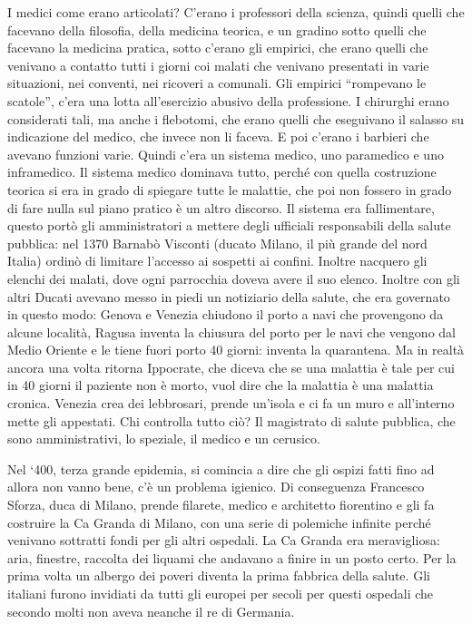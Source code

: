 \documentclass[]{article}
\begin{document}
I medici come erano articolati? C'erano i professori della scienza,
quindi quelli che facevano della filosofia, della medicina teorica, e un
gradino sotto quelli che facevano la medicina pratica, sotto c'erano gli
empirici, che erano quelli che venivano a contatto tutti i giorni coi
malati che venivano presentati in varie situazioni, nei conventi, nei
ricoveri a comunali. Gli empirici ``rompevano le scatole'', c'era una
lotta all'esercizio abusivo della professione. I chirurghi erano
considerati tali, ma anche i flebotomi, che erano quelli che eseguivano
il salasso su indicazione del medico, che invece non li faceva. E poi
c'erano i barbieri che avevano funzioni varie. Quindi c'era un sistema
medico, uno paramedico e uno inframedico. Il sistema medico dominava
tutto, perché con quella costruzione teorica si era in grado di spiegare
tutte le malattie, che poi non fossero in grado di fare nulla sul piano
pratico è un altro discorso. Il sistema era fallimentare, questo portò
gli amministratori a mettere degli ufficiali responsabili della salute
pubblica: nel 1370 Barnabò Visconti (ducato Milano, il più grande del
nord Italia) ordinò di limitare l'accesso ai sospetti ai confini.
Inoltre nacquero gli elenchi dei malati, dove ogni parrocchia doveva
avere il suo elenco. Inoltre con gli altri Ducati avevano messo in piedi
un notiziario della salute, che era governato in questo modo: Genova e
Venezia chiudono il porto a navi che provengono da alcune località,
Ragusa inventa la chiusura del porto per le navi che vengono dal Medio
Oriente e le tiene fuori porto 40 giorni: inventa la quarantena. Ma in
realtà ancora una volta ritorna Ippocrate, che diceva che se una
malattia è tale per cui in 40 giorni il paziente non è morto, vuol dire
che la malattia è una malattia cronica. Venezia crea dei lebbrosari,
prende un'isola e ci fa un muro e all'interno mette gli appestati. Chi
controlla tutto ciò? Il magistrato di salute pubblica, che sono
amministrativi, lo speziale, il medico e un cerusico.

Nel `400, terza grande epidemia, si comincia a dire che gli ospizi fatti
fino ad allora non vanno bene, c'è un problema igienico. Di conseguenza
Francesco Sforza, duca di Milano, prende filarete, medico e architetto
fiorentino e gli fa costruire la Ca Granda di Milano, con una serie di
polemiche infinite perché venivano sottratti fondi per gli altri
ospedali. La Ca Granda era meravigliosa: aria, finestre, raccolta dei
liquami che andavano a finire in un posto certo. Per la prima volta un
albergo dei poveri diventa la prima fabbrica della salute. Gli italiani
furono invidiati da tutti gli europei per secoli per questi ospedali che
secondo molti non aveva neanche il re di Germania.
\end{document}
